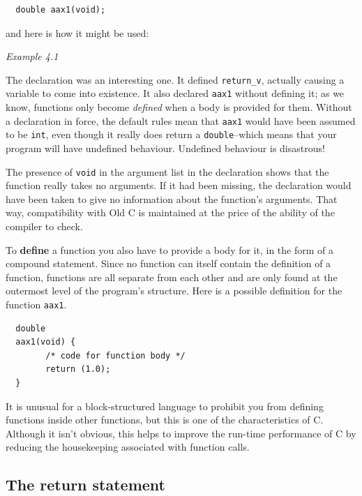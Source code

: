 \begin{Verbatim}
  double aax1(void);
\end{Verbatim}

   and here is how it might be used:


\begin{center}\textit{Example 4.1}\end{center}


   The declaration was an interesting one. It defined
    \texttt{return\_v}, actually causing a variable to come into
    existence. It also declared \texttt{aax1} without defining it; as we
    know, functions only become \textit{defined} when a body is provided for
    them. Without a declaration in force, the default rules mean that
    \texttt{aax1} would have been assumed to be \texttt{int}, even
    though it really does return a \texttt{double}--which means that
    your program will have undefined behaviour. Undefined behaviour is
    disastrous!


   The presence of \texttt{void} in the argument list in the
    declaration shows that the function really takes no arguments. If it had
    been missing, the declaration would have been taken to give no
    information about the function's arguments. That way, compatibility with
    Old C is maintained at the price of the ability of the compiler to
    check.


   To \textbf{define} a function you also have to provide a body for
    it, in the form of a compound statement. Since no function can itself
    contain the definition of a function, functions are all separate from
    each other and are only found at the outermost level of the program's
    structure. Here is a possible definition for the function
    \texttt{aax1}.

\begin{Verbatim}
  double
  aax1(void) {
        /* code for function body */
        return (1.0);
  }
\end{Verbatim}

   It is unusual for a block-structured language to prohibit you from
    defining functions inside other functions, but this is one of the
    characteristics of C. Although it isn't obvious, this helps to improve
    the run-time performance of C by reducing the housekeeping associated
    with function calls.


  

  \subsection{The return statement}
   

